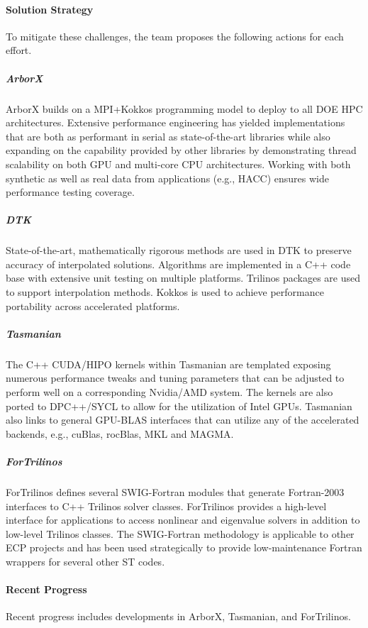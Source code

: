 \paragraph{Solution Strategy}
To mitigate these challenges, the team proposes the following actions for each effort.

\subparagraph{ArborX} ArborX builds on a MPI+Kokkos programming model to deploy to all
DOE HPC architectures. Extensive performance engineering has yielded
implementations that are both as performant in serial as state-of-the-art
libraries while also expanding on the capability provided by other libraries by
demonstrating thread scalability on both GPU and multi-core CPU architectures.
Working with both synthetic as well as real data from applications (e.g., HACC)
ensures wide performance testing coverage.

\subparagraph{DTK} State-of-the-art, mathematically rigorous methods are used in DTK
to preserve accuracy of interpolated solutions.  Algorithms are implemented in
a C++ code base with extensive unit testing on multiple platforms.  Trilinos
packages are used to support interpolation methods.  Kokkos is used to achieve
performance portability across accelerated platforms.

\subparagraph{Tasmanian} The C++ CUDA/HIPO kernels within Tasmanian are templated exposing
numerous performance tweaks and tuning parameters that can be adjusted to
perform well on a corresponding Nvidia/AMD system.
The kernels are also ported to DPC++/SYCL to allow for the utilization
of Intel GPUs. Tasmanian also links to general GPU-BLAS interfaces that can
utilize any of the accelerated backends, e.g., cuBlas, rocBlas, MKL and MAGMA.

\subparagraph{ForTrilinos}
ForTrilinos defines several SWIG-Fortran modules that generate Fortran-2003
interfaces to C++ Trilinos solver classes. ForTrilinos provides a
high-level interface for applications to access nonlinear and eigenvalue
solvers in addition to low-level Trilinos classes. The SWIG-Fortran methodology
is applicable to other ECP projects and has been used strategically to provide
low-maintenance Fortran wrappers for several other ST codes.


\paragraph{Recent Progress}
Recent progress includes developments in ArborX, Tasmanian, and ForTrilinos.

